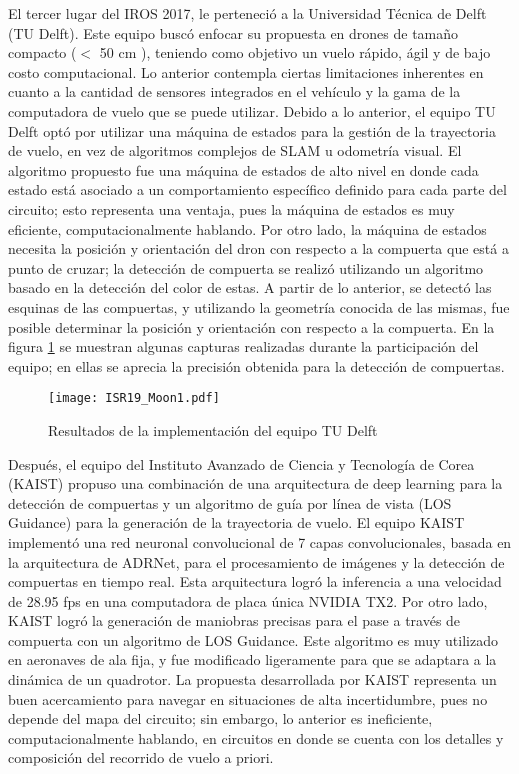 El tercer lugar del IROS 2017, le perteneció a la Universidad Técnica de Delft (TU Delft). Este equipo buscó enfocar su propuesta en drones de tamaño compacto ($<$ 50 cm ), teniendo como objetivo un vuelo rápido, ágil y de bajo costo computacional. Lo anterior contempla ciertas limitaciones inherentes en cuanto a la cantidad de sensores integrados en el vehículo y la gama de la computadora de vuelo que se puede utilizar.
Debido a lo anterior, el equipo TU Delft optó por utilizar una máquina de estados para la gestión de la trayectoria de vuelo, en vez de algoritmos complejos de SLAM u odometría visual. El algoritmo propuesto fue una máquina de estados de alto nivel en donde cada estado está asociado a un comportamiento específico definido para cada parte del circuito; esto representa una ventaja, pues la máquina de estados es muy eficiente, computacionalmente hablando. 
Por otro lado, la máquina de estados necesita la posición y orientación del dron con respecto a la compuerta que está a punto de cruzar; la detección de compuerta se realizó utilizando un algoritmo basado en la detección del color de estas. A partir de lo anterior, se detectó las esquinas de las compuertas, y utilizando la geometría conocida de las mismas, fue posible determinar la posición y orientación con respecto a la compuerta. En la figura \ref{fig:ISR19_Moon1} se muestran algunas capturas realizadas durante la participación del equipo; en ellas se aprecia la precisión obtenida para la detección de compuertas.

\begin{figure}[ht]
    \centering
    \texttt{[image: ISR19\_Moon1.pdf]}
    \caption{Resultados de la implementación del equipo TU Delft \citet{moon2019challenges}}
    \label{fig:ISR19_Moon1}
\end{figure}

Después, el equipo del Instituto Avanzado de Ciencia y Tecnología de Corea (KAIST) propuso una combinación de una arquitectura de deep learning para la detección de compuertas y un algoritmo de guía por línea de vista (LOS Guidance) para la generación de la trayectoria de vuelo.
 El equipo KAIST implementó una red neuronal convolucional de 7 capas convolucionales, basada en la arquitectura de ADRNet, para el procesamiento de imágenes y la detección de compuertas en tiempo real. Esta arquitectura logró la inferencia a una velocidad de 28.95 fps en una computadora de placa única NVIDIA TX2. 
Por otro lado, KAIST logró la generación de maniobras precisas para el pase a través de compuerta con un algoritmo de LOS Guidance. Este algoritmo es muy utilizado en aeronaves de ala fija, y fue modificado ligeramente para que se adaptara a la dinámica de un quadrotor.
La propuesta desarrollada por KAIST representa un buen acercamiento para navegar en situaciones de alta incertidumbre, pues no depende del mapa del circuito; sin embargo, lo anterior es ineficiente, computacionalmente hablando, en circuitos en donde se cuenta con los detalles y composición del recorrido de vuelo a priori.

